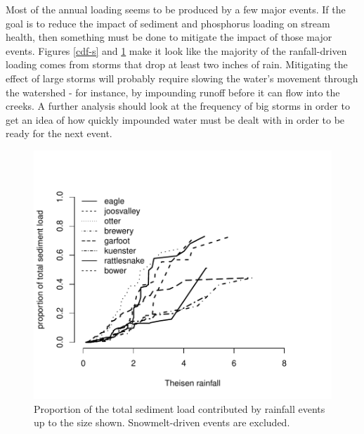 \documentclass[10pt]{article}
\begin{document}
Most of the annual loading seems to be produced by a few major events. If the goal is to reduce the impact of sediment and phosphorus loading on stream health, then something must be done to mitigate the impact of those major events. Figures \ref{cdf-s} and \ref{cdf-p} make it look like the majority of the ranfall-driven loading comes from storms that drop at least two inches of rain. Mitigating the effect of large storms will probably require slowing the water's movement through the watershed - for instance, by impounding runoff before it can flow into the creeks. A further analysis should look at the frequency of big storms in order to get an idea of how quickly impounded water must be dealt with in order to be ready for the next event.\\


\begin{figure}
    \begin{center}
\includegraphics{loadings-figure2}
    \end{center}
    \caption{Proportion of the total sediment load contributed by rainfall events up to the size shown. Snowmelt-driven events are excluded.\label{cdf-p}}
\end{figure}
\end{document}
